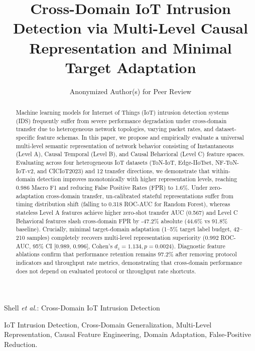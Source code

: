 \documentclass[10pt,journal,compsoc]{IEEEtran}
\begin{document}
\title{Cross-Domain IoT Intrusion Detection via Multi-Level Causal Representation and Minimal Target Adaptation}

\author{Anonymized Author(s) for Peer Review}

%
{Shell \MakeLowercase{\textit{et al.}}: Cross-Domain IoT Intrusion Detection}

\maketitle

\begin{abstract}
Machine learning models for Internet of Things (IoT) intrusion detection systems (IDS) frequently suffer from severe performance degradation under cross-domain transfer due to heterogeneous network topologies, varying packet rates, and dataset-specific feature schemas. In this paper, we propose and empirically evaluate a universal multi-level semantic representation of network behavior consisting of Instantaneous (Level A), Causal Temporal (Level B), and Causal Behavioral (Level C) feature spaces. Evaluating across four heterogeneous IoT datasets (ToN-IoT, Edge-IIoTset, NF-ToN-IoT-v2, and CICIoT2023) and 12 transfer directions, we demonstrate that within-domain detection improves monotonically with higher representation levels, reaching 0.986 Macro F1 and reducing False Positive Rates (FPR) to 1.6\%. Under zero-adaptation cross-domain transfer, un-calibrated stateful representations suffer from timing distribution shift (falling to 0.318 ROC-AUC for Random Forest), whereas stateless Level A features achieve higher zero-shot transfer AUC (0.567) and Level C Behavioral features slash cross-domain FPR by -47.2\% absolute (44.6\% vs 91.8\% baseline). Crucially, minimal target-domain adaptation (1--5\% target label budget, 42--210 samples) completely recovers multi-level representation superiority (0.992 ROC-AUC, 95\% CI [0.989, 0.996], Cohen's $d_z = 1.134, p = 0.0024$). Diagnostic feature ablations confirm that performance retention remains 97.2\% after removing protocol indicators and throughput rate metrics, demonstrating that cross-domain performance does not depend on evaluated protocol or throughput rate shortcuts.
\end{abstract}

\begin{IEEEkeywords}
IoT Intrusion Detection, Cross-Domain Generalization, Multi-Level Representation, Causal Feature Engineering, Domain Adaptation, False-Positive Reduction.
\end{IEEEkeywords}
\end{document}

